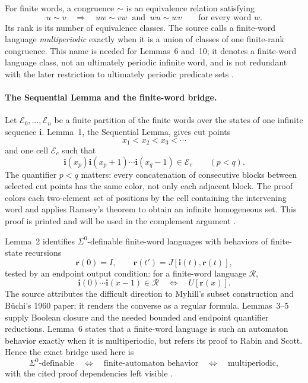For finite words, a congruence \(\sim\) is an equivalence relation satisfying
\[
 u\sim v
 \quad\Longrightarrow\quad
 uw\sim vw\ \text{ and }\ wu\sim wv
 \qquad\text{for every word }w.
\]
Its rank is its number of equivalence classes.  The source calls a finite-word
language \emph{multiperiodic} exactly when it is a union of classes of one
finite-rank congruence.  This name is needed for Lemmas~6 and~10; it denotes a
finite-word language class, not an ultimately periodic infinite word, and is
not redundant with the later restriction to ultimately periodic predicate
sets \cite[pp.~2--4]{Buchi1962}.

\paragraph{The Sequential Lemma and the finite-word bridge.}
Let \(\mathcal E_0,\ldots,\mathcal E_n\) be a finite partition of the finite
words over the states of one infinite sequence \(\mathbf i\).  Lemma~1, the
Sequential Lemma, gives cut points
\[
 x_1<x_2<x_3<\cdots
\]
and one cell \(\mathcal E_c\) such that
\[
 \mathbf i(x_p)\mathbf i(x_p+1)\cdots\mathbf i(x_q-1)
 \in\mathcal E_c
 \qquad(p<q).
\]
The quantifier \(p<q\) matters: every concatenation of consecutive blocks
between selected cut points has the same color, not only each adjacent block.
The proof colors each two-element set of positions by the cell containing the
intervening word and applies Ramsey's theorem to obtain an infinite
homogeneous set.  This proof is printed and will be used in the complement
argument \cite[p.~3]{Buchi1962}.

Lemma~2 identifies \(\Sigma^0\)-definable finite-word languages with behaviors
of finite-state recursions
\[
 \mathbf r(0)=I,
 \qquad
 \mathbf r(t')=J[\mathbf i(t),\mathbf r(t)],
\]
tested by an endpoint output condition: for a finite-word language
\(\mathcal R\),
\[
 \mathbf i(0)\cdots\mathbf i(x-1)\in\mathcal R
 \quad\Longleftrightarrow\quad
 U[\mathbf r(x)].
\]
The source attributes the difficult
direction to Myhill's subset construction and B\"uchi's 1960 paper; it renders
the converse as a regular formula.  Lemmas~3--5 supply Boolean closure and the
needed bounded and endpoint quantifier reductions.  Lemma~6 states that a
finite-word language is such an automaton behavior exactly when it is
multiperiodic, but refers its proof to Rabin and Scott.  Hence the exact bridge
used here is
\[
 \Sigma^0\text{-definable}
 \quad\Longleftrightarrow\quad
 \text{finite-automaton behavior}
 \quad\Longleftrightarrow\quad
 \text{multiperiodic},
\]
with the cited proof dependencies left visible \cite[pp.~3--4]{Buchi1962}.

